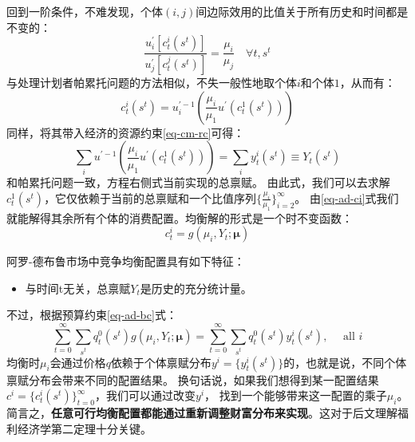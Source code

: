 回到一阶条件，不难发现，个体$(i,j)$间边际效用的比值关于所有历史和时间都是不变的：
\begin{equation}
    \frac{u_i^{\prime}\left[c_t^i\left(s^t\right)\right]}{u_j^{\prime}\left[c_t^j\left(s^t\right)\right]}=\frac{\mu_i}{\mu_j}
        \quad \forall t, s^t
\end{equation}
与处理计划者帕累托问题的方法相似，不失一般性地取个体$i$和个体$1$，从而有：
\begin{equation}    \label{eq-ad-ci}
    c_t^i\left(s^t\right)=u_i^{\prime-1}\left(\frac{\mu_i}{\mu_1} u^{\prime}\left(c_t^1\left(s^t\right)\right)\right)
\end{equation}
同样，将其带入经济的资源约束\ref{eq-cm-rc}可得：
\begin{equation}    \label{eq-ad-c1}
    \sum_i u^{\prime-1}\left(\frac{\mu_i}{\mu_1} u^{\prime}\left(c_t^1\left(s^t\right)\right)\right)=\sum_i y_t^i\left(s^t\right)
        \equiv Y_t\left(s^t\right)
\end{equation}
和帕累托问题一致，方程右侧式当前实现的总禀赋。
由此式，我们可以去求解$c_t^1\left(s^t\right)$，它仅依赖于当前的总禀赋和一个比值序列$\{\frac{\mu_i}{\mu_1}\}_{i=2}^{\infty}$。
由\ref{eq-ad-ci}式我们就能解得其余所有个体的消费配置。均衡解的形式是一个时不变函数：
\begin{equation*}
    c_t^i=g\left(\mu_i, Y_t ; \boldsymbol{\mu}\right)
\end{equation*}

\begin{property}    \label{pr-ad-equi}
    阿罗-德布鲁市场中竞争均衡配置具有如下特征：
    \begin{itemize}
        \item 与时间t无关，总禀赋$Y_t$是历史的充分统计量。
    \end{itemize}
\end{property}

不过，根据预算约束\ref{eq-ad-bc}式：
\begin{equation*}
    \sum_{t=0}^{\infty} \sum_{s^t} q_t^0\left(s^t\right) g\left(\mu_i, Y_t ; \boldsymbol{\mu}\right)
        =\sum_{t=0}^{\infty} \sum_{s^t} q_t^0\left(s^t\right) y_t^i\left(s^t\right), \quad \text { all } i
\end{equation*}
均衡时$\mu_i$会通过价格$q$依赖于个体禀赋分布$y^i=\{y_t^i\left(s^t\right)\}$的，也就是说，不同个体禀赋分布会带来不同的配置结果。
换句话说，如果我们想得到某一配置结果$c^i=\{c_t^i\left(s^t\right)\}_{t=0}^{\infty}$，我们可以通过改变$y^i$，
找到一个能够带来这一配置的乘子$\mu_i$。简言之，\textbf{任意可行均衡配置都能通过重新调整财富分布来实现}。这对于后文理解福利经济学第二定理十分关键。

